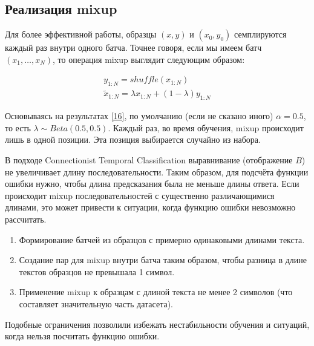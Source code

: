 \subsection{Реализация mixup}
Для более эффективной работы, образцы $(x, y)$ и $(x_0, y_0)$ семплируются каждый раз внутри одного батча. Точнее говоря, если мы имеем батч $(x_1, \dots, x_N)$, то операция mixup выглядит следующим образом:

\begin{equation}
\begin{split}
y_{1:N} = shuffle(x_{1:N}) \\
\tilde{x}_{1:N} = \lambda x_{1:N} + (1 - \lambda) y_{1:N}
\end{split}
\end{equation}

Основываясь на результатах \hyperlink{cite.Bas19}{[16]}, по умолчанию (если не сказано иного) $\alpha = 0.5$, то есть $\lambda \sim Beta(0.5, 0.5)$. Каждый раз, во время обучения, mixup происходит лишь в одной позиции. Эта позиция выбирается случайно из набора.


В подходе Connectionist Temporal Classification выравнивание (отображение $B$) не увеличивает длину последовательности. Таким образом, для подсчёта функции ошибки нужно, чтобы длина предсказания была не меньше длины ответа. Если происходит mixup последовательностей с существенно различающимися длинами, это может привести к ситуации, когда функцию ошибки невозможно рассчитать. 

\begin{enumerate}
\item Формирование батчей из образцов с примерно одинаковыми длинами текста.
\item Создание пар для mixup внутри батча таким образом, чтобы разница в длине текстов образцов не превышала 1 символ.
\item Применение mixup к образцам с длиной текста не менее 2 символов (что составляет значительную часть датасета).
\end{enumerate} 

Подобные ограничения позволили избежать нестабильности обучения и ситуаций, когда нельзя посчитать функцию ошибки.

\newpage
